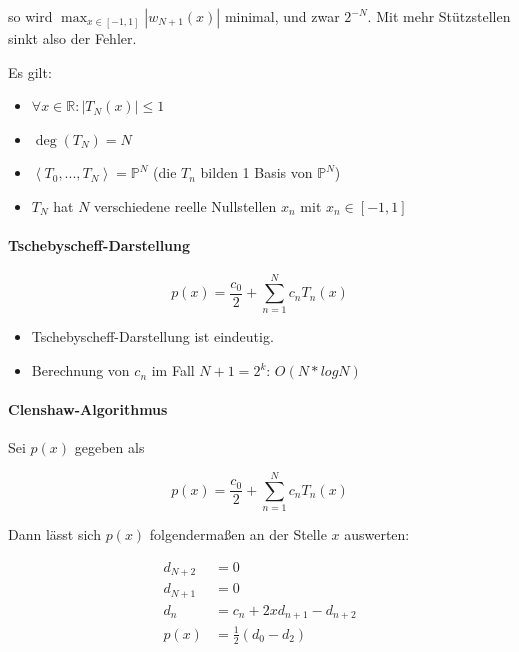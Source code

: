 \documentclass[a4paper, 14pt]{article}
\begin{document}
	so wird $\max_{x \in [-1, 1]}{|w_{N + 1}(x)|}$ minimal, und zwar $2^{-N}$.
	Mit mehr Stützstellen sinkt also der Fehler.

	Es gilt:
	
	\begin{itemize}
		\item $\forall x \in \mathbb{R} : |T_N(x)| \leq 1$
		\item $\deg(T_N) = N$
		\item $\left< T_0, ..., T_N \right> = \mathbb{P}^N$ (die $T_n$ bilden 1 Basis von $\mathbb{P}^N$)
		\item $T_N$ hat $N$ verschiedene reelle Nullstellen $x_n$ mit $x_n \in [-1, 1]$
	\end{itemize}

	\paragraph{Tschebyscheff-Darstellung}

	\begin{equation}
		p(x) = \frac{c_0}{2} + \sum_{n = 1}^{N}{c_n T_n(x)}
	\end{equation}

	\begin{itemize}
		\item Tschebyscheff-Darstellung ist eindeutig.
		\item Berechnung von $c_n$ im Fall $N + 1 = 2^k$: $O(N * log N)$
	\end{itemize}

	\paragraph{Clenshaw-Algorithmus}

	Sei $p(x)$ gegeben als

	\begin{equation}
		p(x) = \frac{c_0}{2} + \sum_{n = 1}^{N}{c_n T_n(x)}
	\end{equation}

	Dann lässt sich $p(x)$ folgendermaßen an der Stelle $x$ auswerten:

	\begin{align}
		d_{N + 2} & = 0 \\
		d_{N + 1} & = 0 \\
		d_n       & = c_n + 2xd_{n + 1} - d_{n + 2} \\
		p(x)      & = \frac{1}{2} (d_0 - d_2)
	\end{align}
\end{document}
